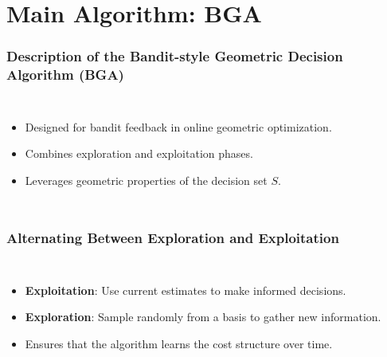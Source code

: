 \documentclass{beamer}
\begin{document}
\section{Main Algorithm: BGA}

\begin{frame}
\frametitle{Description of the Bandit-style Geometric Decision Algorithm (BGA)}
\begin{columns}
    \begin{itemize}
        \item Designed for bandit feedback in online geometric optimization.
        \item Combines exploration and exploitation phases.
        \item Leverages geometric properties of the decision set \( S \).
    \end{itemize}
\end{columns}
\end{frame}

\begin{frame}
\frametitle{Alternating Between Exploration and Exploitation}
\begin{columns}
    \begin{itemize}
        \item \textbf{Exploitation}: Use current estimates to make informed decisions.
        \item \textbf{Exploration}: Sample randomly from a basis to gather new information.
        \item Ensures that the algorithm learns the cost structure over time.
    \end{itemize}
\end{columns}
\end{frame}
\end{document}
